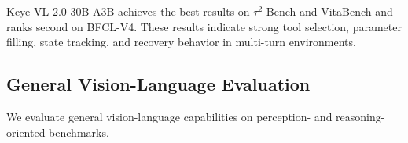 \documentclass{article} %
\begin{document}
\begin{table}[t]
\centering
\caption{Tool-use and function-calling evaluation of Keye-VL-2.0-30B-A3B against representative baselines. \textbf{Bold} marks the best result per row, \underline{underline} marks the second-best, and ``--'' indicates an unavailable comparable score.}
\label{tab:tool_use_eval}
\setlength{\tabcolsep}{3pt}
\renewcommand{\arraystretch}{1.15}
\end{table}

Keye-VL-2.0-30B-A3B achieves the best results on $\tau^2$-Bench and VitaBench and ranks second on BFCL-V4. These results indicate strong tool selection, parameter filling, state tracking, and recovery behavior in multi-turn environments.

\subsection{General Vision-Language Evaluation}

We evaluate general vision-language capabilities on perception- and reasoning-oriented benchmarks.
\end{document}
